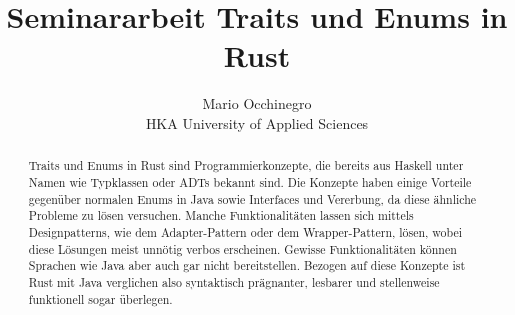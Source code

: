 \documentclass[a4paper, 1ppt]{article}
\title{Seminararbeit Traits und Enums in Rust}
\date{}
\author{Mario Occhinegro\\HKA University of Applied Sciences}
\begin{document}
\nocite{*}
\maketitle
\newpage
\clearpage
\tableofcontents
\setcounter{page}{1}
\newpage
{}
\maketitle
\begin{abstract}
		Traits und Enums in Rust sind Programmierkonzepte, die bereits aus Haskell unter Namen wie Typklassen oder ADTs bekannt sind\cite{haskellslides}. Die Konzepte haben einige Vorteile gegenüber normalen Enums in Java sowie Interfaces und Vererbung, da diese ähnliche Probleme zu lösen versuchen.
Manche Funktionalitäten lassen sich mittels Designpatterns, wie dem Adapter-Pattern oder dem Wrapper-Pattern, lösen, wobei diese Lösungen meist unnötig verbos erscheinen. Gewisse Funktionalitäten können Sprachen wie Java aber auch gar nicht bereitstellen.
Bezogen auf diese Konzepte ist Rust mit Java verglichen also syntaktisch prägnanter, lesbarer und stellenweise funktionell sogar überlegen.
\end{abstract}
\end{document}
